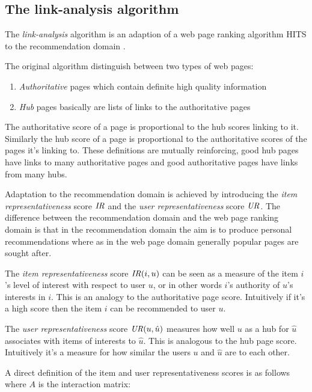 \newpage
\subsection{The link-analysis algorithm}\label{sec:background:theory:linkanalysis}

The \textit{link-analysis} algorithm is an adaption of a web page ranking algorithm HITS \cite{kleinberg1999authoritative} to the recommendation domain \cite{huang2004link, huang2007comparison}.

The original algorithm distinguish between two types of web pages:

\begin{enumerate}
    \item \textit{Authoritative} pages which contain definite high quality information
    \item \textit{Hub} pages basically are lists of links to the authoritative pages
\end{enumerate}

The authoritative score of a page is proportional to the hub scores linking to it. Similarly the hub score of a page is proportional to the authoritative scores of the pages it's linking to. These definitions are mutually reinforcing, good hub pages have links to many authoritative pages and good authoritative pages have links from many hubs.

Adaptation to the recommendation domain is achieved by introducing the \textit{item representativeness} score $\mathit{IR}$ and the \textit{user representativeness} score $\mathit{UR}$. The difference between the recommendation domain and the web page ranking domain is that in the recommendation domain the aim is to produce personal recommendations where as in the web page domain generally popular pages are sought after.

The \textit{item representativeness} score $\mathit{IR}(i, u)$ can be seen as a measure of the item $i$'s level of interest with respect to user $u$, or in other words $i$'s authority of $u$'s interests in $i$. This is an analogy to the authoritative page score. Intuitively if it's a high score then the item $i$ can be recommended to user $u$.

The \textit{user representativeness} score $\mathit{UR}(u, \hat{u})$ measures how well $u$ as a hub for $\hat{u}$ associates with items of interests to $\hat{u}$. This is analogous to the hub page score. Intuitively it's a measure for how similar the users $u$ and $\hat{u}$ are to each other.

A direct definition of the item and user representativeness scores is as follows where $A$ is the interaction matrix:

